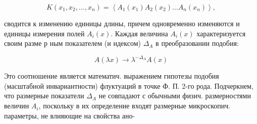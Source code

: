 \documentclass[10pt]{article}
\begin{document}
\[

K\left(x_{1}, x_{2}, \ldots, x_{n}\right)=\left\langle A_{1}\left(x_{1}\right) A_{2}\left(x_{2}\right) \ldots A_{n}\left(x_{n}\right)\right\rangle,

\]



сводится к изменению единицы длины, причем одновременно изменяются и единицы измерения полей $A_{i}(x)$. Каждая величина $A_{i}(x)$ характеризуется своим разме р ным показателем (и ндексом) $\Delta_{A}$ в преобразовании подобия:



\[

A(\lambda x) \rightarrow \lambda^{-\Delta_{A}} A(x)

\]



Это соотношение является математич. выражением гипотезы подобия (масштабной инвариантности) флуктуаций в точке Ф. П. 2-го рода. Подчеркнем, что размерные показатели $\Delta_{A}$ не совпадают с обычными физич. размерностями величин $A_{i}$, поскольку в их определение входят размерные микроскопич. параметры, не влияющие на свойства ано-
\end{document}
